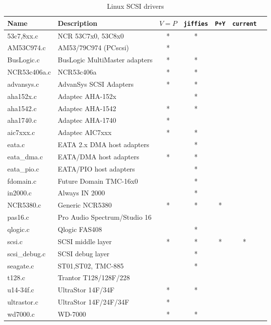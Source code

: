 \begin{table}
{\small
\begin{tabular}[c]{|l|l||c|c|c|c|c|}
\hline
Name	& Description			& $V=P$
					  & {\tt jiffies}
					    & {\tt P+Y}
					      & {\tt current}
					 	&	\\
\hline
\hline
53c7,8xx.c	& NCR 53C7x0, 53C8x0		&*&*& & &	\\\hline
AM53C974.c	& AM53/79C974 (PCscsi)		&*& & &	&	\\\hline
BusLogic.c	& BusLogic MultiMaster adapters	&*&*& &	&	\\\hline
NCR53c406a.c	& NCR53c406a			&*&*& & &	\\\hline
advansys.c	& AdvanSys SCSI Adapters	&*&*& &	&	\\\hline
aha152x.c	& Adaptec AHA-152x		& &*& &	&	\\\hline
aha1542.c	& Adaptec AHA-1542		&*&*& &	&	\\\hline
aha1740.c	& Adaptec AHA-1740		&*& & &	&	\\\hline
aic7xxx.c	& Adaptec AIC7xxx		&*&*& &	&	\\\hline
eata.c		& EATA 2.x DMA host adapters	& &*& &	&	\\\hline
eata_dma.c	& EATA/DMA host adapters	&*&*& &	&	\\\hline
eata_pio.c	& EATA/PIO host adapters	& &*& &	&	\\\hline
fdomain.c	& Future Domain TMC-16x0	& &*& &	&	\\\hline
in2000.c	& Always IN 2000		& &*& &	&	\\\hline
NCR5380.c	& Generic NCR5380		&*&*&*&	&	\\\hline
pas16.c		& Pro Audio Spectrum/Studio 16	& & & &	&	\\\hline
qlogic.c	& Qlogic FAS408			& &*& &	&	\\\hline
scsi.c		& SCSI middle layer		&*&*&*&*&	\\\hline
scsi_debug.c	& SCSI debug layer		& &*& &	&	\\\hline
seagate.c	& ST01,ST02, TMC-885		& &*& &	&	\\\hline
t128.c		& Trantor T128/128F/228		& & & &	&	\\\hline
u14-34f.c	& UltraStor 14F/34F		&*&*& &	&	\\\hline
ultrastor.c	& UltraStor 14F/24F/34F		&*& & &	&	\\\hline
wd7000.c	& WD-7000			&*&*& &	&	\\\hline
\end{tabular}
\label{linux-scsi-drivers}
\caption{Linux SCSI drivers}
}
\end{table}
